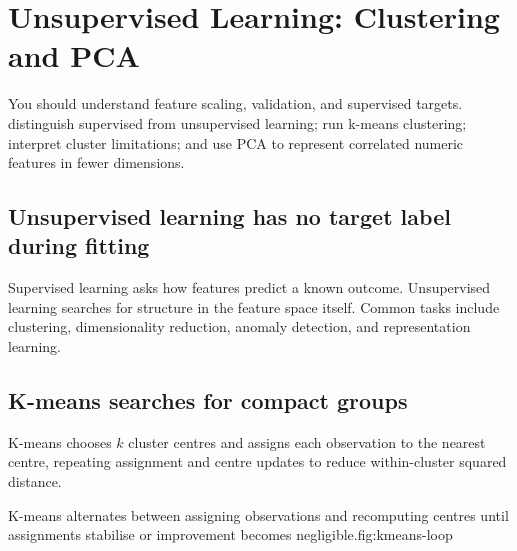 \chapter{Unsupervised Learning: Clustering and PCA}
\label{ch:unsupervised}
\chapterguide
  {You should understand feature scaling, validation, and supervised targets.}
  {distinguish supervised from unsupervised learning; run k-means clustering; interpret cluster limitations; and use PCA to represent correlated numeric features in fewer dimensions.}

\section{Unsupervised learning has no target label during fitting}
Supervised learning asks how features predict a known outcome. Unsupervised learning searches for structure in the feature space itself. Common tasks include clustering, dimensionality reduction, anomaly detection, and representation learning.

\section{K-means searches for compact groups}
K-means chooses \(k\) cluster centres and assigns each observation to the nearest centre, repeating assignment and centre updates to reduce within-cluster squared distance.

\begin{utpfig}{K-means alternates between assigning observations and recomputing centres until assignments stabilise or improvement becomes negligible.}{fig:kmeans-loop}
\end{utpfig}


